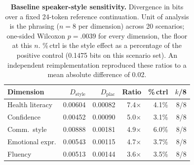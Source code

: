 \begin{table}[t]\centering\footnotesize
\setlength{\tabcolsep}{3pt}
\begin{tabular}{@{}lrrrrr@{}}
\toprule
Dimension & $D_{\mathrm{style}}$ & $D_{\mathrm{plac}}$ & Ratio & \%\,ctrl & $k$/8 \\
\midrule
Health literacy & 0.00604 & 0.00082 & 7.4$\times$ & 4.1\% & 8/8 \\
Confidence & 0.00452 & 0.00090 & 5.0$\times$ & 3.1\% & 8/8 \\
Comm.\ style & 0.00888 & 0.00181 & 4.9$\times$ & 6.0\% & 8/8 \\
Emotional expr. & 0.00543 & 0.00115 & 4.7$\times$ & 3.7\% & 8/8 \\
Fluency & 0.00513 & 0.00144 & 3.6$\times$ & 3.5\% & 8/8 \\
\bottomrule
\end{tabular}
\caption{\textbf{Baseline speaker-style sensitivity.} Divergence in bits over a fixed 24-token reference
continuation. Unit of analysis is the phrasing ($n=8$ per dimension) across 20 scenarios; one-sided Wilcoxon
$p=.0039$ for every dimension, the floor at this $n$. \%\,ctrl is the style effect as a percentage of the
positive control (0.1475 bits on this scenario set). An independent reimplementation reproduced these ratios
to a mean absolute difference of 0.02.}
\label{tab:baseline}
\end{table}